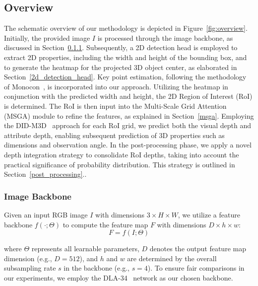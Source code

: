 \documentclass[journal]{IEEEtran}
\begin{document}
	\subsection{Overview}
	The schematic overview of our methodology is depicted in Figure~\ref{fig:overview}. Initially, the provided image $I$ is processed through the image backbone, as discussed in Section~\ref{backbone}. Subsequently, a 2D detection head is employed to extract 2D properties, including the width and height of the bounding box, and to generate the heatmap for the projected 3D object center, as elaborated in Section~\ref{2d_detection_head}. Key point estimation, following the methodology of Monocon~\cite{monocon}, is incorporated into our approach. Utilizing the heatmap in conjunction with the predicted width and height, the 2D Region of Interest (RoI) is determined. The RoI is then input into the Multi-Scale Grid Attention (MSGA) module to refine the features, as explained in Section~\ref{msga}. Employing the DID-M3D~\cite{didm3d} approach for each RoI grid, we predict both the visual depth and attribute depth, enabling subsequent prediction of 3D properties such as dimensions and observation angle. In the post-processing phase, we apply a novel depth integration strategy to consolidate RoI depths, taking into account the practical significance of probability distribution. This strategy is outlined in Section~\ref{post_processing}..
	
	\subsubsection{Image Backbone}\label{backbone}
	Given an input RGB image $I$ with dimensions $3 \times H \times W$, we utilize a feature backbone $f(\cdot; \Theta)$ to compute the feature map $F$ with dimensions $D \times h \times w$:
	\begin{equation}
		F = f(I;\Theta)
		\label{eq:backbone}
	\end{equation}

	where $\Theta$ represents all learnable parameters, $D$ denotes the output feature map dimension (e.g., $D=512$), and $h$ and $w$ are determined by the overall subsampling rate $s$ in the backbone (e.g., $s=4$). To ensure fair comparisons in our experiments, we employ the DLA-34~\cite{dla} network as our chosen backbone.
	
\end{document}
